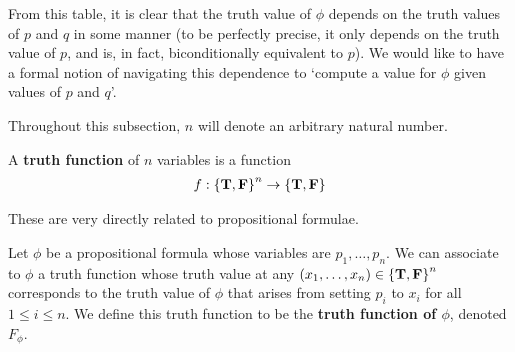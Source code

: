 From this table, it is clear that the truth value of $\phi$ depends on the truth values of $p$ and $q$ in some manner (to be perfectly precise, it only depends on the truth value of $p$, and is, in fact, biconditionally equivalent to $p$). We would like to have a formal notion of navigating this dependence to `compute a value for $\phi$ given values of $p$ and $q$'.

Throughout this subsection, $n$ will denote an arbitrary natural number.

\begin{boxdefinition}
    A \textbf{truth function} of $n$ variables is a function
    \begin{align*}
        f : \left\{ \mathbf{T}, \mathbf{F} \right\}^n \to \left\{ \mathbf{T}, \mathbf{F} \right\}
    \end{align*}
\end{boxdefinition}

These are very directly related to propositional formulae.

\begin{boxdefinition}
    Let $\phi$ be a propositional formula whose variables are $p_1, \ldots, p_n$. We can associate to $\phi$ a truth function whose truth value at any $\left( x_1, \ldots, x_n \right) \in \left\{ \mathbf{T}, \mathbf{F} \right\}^n$ corresponds to the truth value of $\phi$ that arises from setting $p_i$ to $x_i$ for all $1 \leq i \leq n$. We define this truth function to be the \textbf{truth function of $\phi$}, denoted $F_{\phi}$.
\end{boxdefinition}